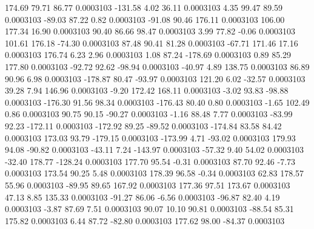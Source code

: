       174.69       79.71       86.77     0.0003103
     -131.58        4.02       36.11     0.0003103
        4.35       99.47       89.59     0.0003103
      -89.03       87.22        0.82     0.0003103
      -91.08       90.46      176.11     0.0003103
      106.00      177.34       16.90     0.0003103
       90.40       86.66       98.47     0.0003103
        3.99       77.82       -0.06     0.0003103
      101.61      176.18      -74.30     0.0003103
       87.48       90.41       81.28     0.0003103
      -67.71      171.46       17.16     0.0003103
      176.74        6.23        2.96     0.0003103
        1.08       87.24     -178.69     0.0003103
        0.89       85.29      177.80     0.0003103
      -92.72       92.62      -98.94     0.0003103
      -40.97        4.89      138.75     0.0003103
       86.89       90.96        6.98     0.0003103
     -178.87       80.47      -93.97     0.0003103
      121.20        6.02      -32.57     0.0003103
       39.28        7.94      146.96     0.0003103
       -9.20      172.42      168.11     0.0003103
       -3.02       93.83      -98.88     0.0003103
     -176.30       91.56       98.34     0.0003103
     -176.43       80.40        0.80     0.0003103
       -1.65      102.49        0.86     0.0003103
       90.75       90.15      -90.27     0.0003103
       -1.16       88.48        7.77     0.0003103
      -83.99       92.23     -172.11     0.0003103
     -172.92       89.25      -89.52     0.0003103
     -174.84       83.58       84.42     0.0003103
      173.03       93.79     -179.15     0.0003103
     -173.99        4.71      -93.02     0.0003103
      179.93       94.08      -90.82     0.0003103
      -43.11        7.24     -143.97     0.0003103
      -57.32        9.40       54.02     0.0003103
      -32.40      178.77     -128.24     0.0003103
      177.70       95.54       -0.31     0.0003103
       87.70       92.46       -7.73     0.0003103
      173.54       90.25        5.48     0.0003103
      178.39       96.58       -0.34     0.0003103
       62.83      178.57       55.96     0.0003103
      -89.95       89.65      167.92     0.0003103
      177.36       97.51      173.67     0.0003103
       47.13        8.85      135.33     0.0003103
      -91.27       86.06       -6.56     0.0003103
      -96.87       82.40        4.19     0.0003103
       -3.87       87.69        7.51     0.0003103
       90.07       10.10       90.81     0.0003103
      -88.54       85.31      175.82     0.0003103
        6.44       87.72      -82.80     0.0003103
      177.62       98.00      -84.37     0.0003103
